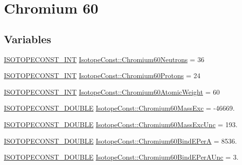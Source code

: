 \hypertarget{group___isotope_const-_chromium-_cr60}{}\section{Chromium 60}
\label{group___isotope_const-_chromium-_cr60}
\subsection*{Variables}
\begin{DoxyCompactItemize}
\item 
\mbox{\hyperlink{group___isotope_const-_macros_ga5f18360b3e99483a35c32d789e62621c}{I\+S\+O\+T\+O\+P\+E\+C\+O\+N\+S\+T\+\_\+\+I\+NT}} \mbox{\hyperlink{group___isotope_const-_chromium-_cr60_gaab216671f527929b876334f144869ad3}{Isotope\+Const\+::\+Chromium60\+Neutrons}} = 36
\item 
\mbox{\hyperlink{group___isotope_const-_macros_ga5f18360b3e99483a35c32d789e62621c}{I\+S\+O\+T\+O\+P\+E\+C\+O\+N\+S\+T\+\_\+\+I\+NT}} \mbox{\hyperlink{group___isotope_const-_chromium-_cr60_gaf5fca7694e3d19ee13c1662add645c37}{Isotope\+Const\+::\+Chromium60\+Protons}} = 24
\item 
\mbox{\hyperlink{group___isotope_const-_macros_ga5f18360b3e99483a35c32d789e62621c}{I\+S\+O\+T\+O\+P\+E\+C\+O\+N\+S\+T\+\_\+\+I\+NT}} \mbox{\hyperlink{group___isotope_const-_chromium-_cr60_gaf56c8cbd8b10eef0986cc1c771c1486a}{Isotope\+Const\+::\+Chromium60\+Atomic\+Weight}} = 60
\item 
\mbox{\hyperlink{group___isotope_const-_macros_ga8f45a7272ce02c0b4c65c44636ed719a}{I\+S\+O\+T\+O\+P\+E\+C\+O\+N\+S\+T\+\_\+\+D\+O\+U\+B\+LE}} \mbox{\hyperlink{group___isotope_const-_chromium-_cr60_gadaadd185df17bd01d5f8d094be77a0f5}{Isotope\+Const\+::\+Chromium60\+Mass\+Exc}} = -\/46669.
\item 
\mbox{\hyperlink{group___isotope_const-_macros_ga8f45a7272ce02c0b4c65c44636ed719a}{I\+S\+O\+T\+O\+P\+E\+C\+O\+N\+S\+T\+\_\+\+D\+O\+U\+B\+LE}} \mbox{\hyperlink{group___isotope_const-_chromium-_cr60_ga5932da67db2d813fcd17f04530ac2670}{Isotope\+Const\+::\+Chromium60\+Mass\+Exc\+Unc}} = 193.
\item 
\mbox{\hyperlink{group___isotope_const-_macros_ga8f45a7272ce02c0b4c65c44636ed719a}{I\+S\+O\+T\+O\+P\+E\+C\+O\+N\+S\+T\+\_\+\+D\+O\+U\+B\+LE}} \mbox{\hyperlink{group___isotope_const-_chromium-_cr60_gaa2030ba0f9755ecfe04cbef4e548b2d0}{Isotope\+Const\+::\+Chromium60\+Bind\+E\+PerA}} = 8536.
\item 
\mbox{\hyperlink{group___isotope_const-_macros_ga8f45a7272ce02c0b4c65c44636ed719a}{I\+S\+O\+T\+O\+P\+E\+C\+O\+N\+S\+T\+\_\+\+D\+O\+U\+B\+LE}} \mbox{\hyperlink{group___isotope_const-_chromium-_cr60_gaeb39bf1f6fc9d1cc24d50459d5c176d4}{Isotope\+Const\+::\+Chromium60\+Bind\+E\+Per\+A\+Unc}} = 3.

\end{DoxyCompactItemize}

